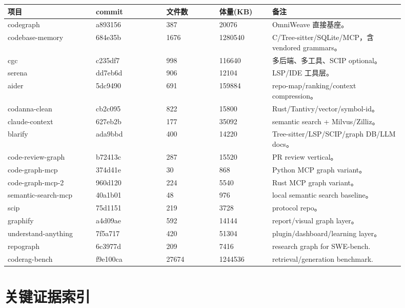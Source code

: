 \documentclass[11pt,a4paper]{article}
\begin{document}
\begin{longtable}{p{0.2\linewidth}p{0.16\linewidth}p{0.12\linewidth}p{0.12\linewidth}p{0.3\linewidth}}
\toprule
项目 & commit & 文件数 & 体量(KB) & 备注 \\
\midrule
\endhead
codegraph & a893156 & 387 & 20076 & OmniWeave 直接基座。 \\
codebase-memory & 684e35b & 1676 & 1280540 & C/Tree-sitter/SQLite/MCP，含 vendored grammars。 \\
cgc & c235df7 & 998 & 116640 & 多后端、多工具、SCIP optional。 \\
serena & dd7eb6d & 906 & 12104 & LSP/IDE 工具层。 \\
aider & 5dc9490 & 691 & 159884 & repo-map/ranking/context compression。 \\
codanna-clean & cb2c095 & 822 & 15800 & Rust/Tantivy/vector/symbol-id。 \\
claude-context & 627eb2b & 177 & 35092 & semantic search + Milvus/Zilliz。 \\
blarify & ada9bbd & 400 & 14220 & Tree-sitter/LSP/SCIP/graph DB/LLM docs。 \\
code-review-graph & b72413c & 287 & 15520 & PR review vertical。 \\
code-graph-mcp & 374d41e & 30 & 868 & Python MCP graph variant。 \\
code-graph-mcp-2 & 960d120 & 224 & 5540 & Rust MCP graph variant。 \\
semantic-search-mcp & 40a1b01 & 48 & 976 & local semantic search baseline。 \\
scip & 75d1151 & 219 & 3728 & protocol repo。 \\
graphify & a4d09ae & 592 & 14144 & report/visual graph layer。 \\
understand-anything & 7f5a717 & 420 & 51304 & plugin/dashboard/learning layer。 \\
repograph & 6c3977d & 209 & 7416 & research graph for SWE-bench. \\
coderag-bench & f9e100ca & 27674 & 1244536 & retrieval/generation benchmark. \\
\bottomrule
\end{longtable}

\section{关键证据索引}
\end{document}
